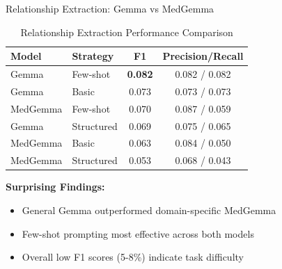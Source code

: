 \documentclass[aspectratio=169, 11pt]{beamer}
\begin{document}
\begin{frame}{Relationship Extraction: Gemma vs MedGemma}
    \vspace{0.3cm}
    \begin{table}[h]
        \centering
        \footnotesize
        \caption{Relationship Extraction Performance Comparison}
        \begin{tabular}{llcc}
        \toprule
        \textbf{Model} & \textbf{Strategy} & \textbf{F1} & \textbf{Precision/Recall} \\
        \midrule
        \textcolor{ulblue}{Gemma} & \textcolor{ulblue}{Few-shot} & \textcolor{ulblue}{\textbf{0.082}} & 0.082 / 0.082 \\
        Gemma & Basic & 0.073 & 0.073 / 0.073 \\
        MedGemma & Few-shot & 0.070 & 0.087 / 0.059 \\
        Gemma & Structured & 0.069 & 0.075 / 0.065 \\
        MedGemma & Basic & 0.063 & 0.084 / 0.050 \\
        MedGemma & Structured & 0.053 & 0.068 / 0.043 \\
        \bottomrule
        \end{tabular}
    \end{table}
    
    \vspace{0.4cm}
    \textbf{Surprising Findings:}
    \begin{itemize}
        \setlength{\itemsep}{0.3cm}
        \item \textcolor{ulblue}{General Gemma outperformed domain-specific MedGemma}
        \item Few-shot prompting most effective across both models
        \item Overall low F1 scores (5-8\%) indicate task difficulty
    \end{itemize}
\end{frame}
\end{document}

